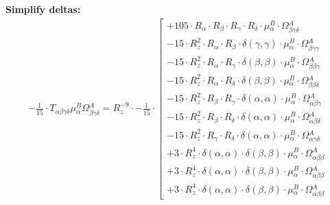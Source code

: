 \documentclass{article}
\begin{document}
\textbf{Simplify deltas:}
\begin{subequations}\begin{gather}
- \frac{1}{15} \cdot T_{\alpha{}\beta{}\gamma{}\delta{}} \mu{}^{B}_{\alpha{}} \Omega{}^{A}_{\beta{}\gamma{}\delta{}} = R_{z}^{-9} \cdot - \frac{1}{15} \cdot  \left[ \begin{array}{c} 
 		+ 105 \cdot R_{\alpha{}} \cdot R_{\beta{}} \cdot R_{\gamma{}} \cdot R_{\delta{}} \cdot \mu{}^{B}_{\alpha{}} \cdot \Omega{}^{A}_{\beta{}\gamma{}\delta{}} 
 \\[0.2em] 		 - 15 \cdot R_{z}^{2} \cdot R_{\alpha{}} \cdot R_{\beta{}} \cdot \delta{}\left(\gamma{}, \gamma{}\right) \cdot \mu{}^{B}_{\alpha{}} \cdot \Omega{}^{A}_{\beta{}\gamma{}\gamma{}} 
 \\[0.2em] 		 - 15 \cdot R_{z}^{2} \cdot R_{\alpha{}} \cdot R_{\gamma{}} \cdot \delta{}\left(\beta{}, \beta{}\right) \cdot \mu{}^{B}_{\alpha{}} \cdot \Omega{}^{A}_{\beta{}\beta{}\gamma{}} 
 \\[0.2em] 		 - 15 \cdot R_{z}^{2} \cdot R_{\alpha{}} \cdot R_{\delta{}} \cdot \delta{}\left(\beta{}, \beta{}\right) \cdot \mu{}^{B}_{\alpha{}} \cdot \Omega{}^{A}_{\beta{}\beta{}\delta{}} 
 \\[0.2em] 		 - 15 \cdot R_{z}^{2} \cdot R_{\beta{}} \cdot R_{\gamma{}} \cdot \delta{}\left(\alpha{}, \alpha{}\right) \cdot \mu{}^{B}_{\alpha{}} \cdot \Omega{}^{A}_{\alpha{}\beta{}\gamma{}} 
 \\[0.2em] 		 - 15 \cdot R_{z}^{2} \cdot R_{\beta{}} \cdot R_{\delta{}} \cdot \delta{}\left(\alpha{}, \alpha{}\right) \cdot \mu{}^{B}_{\alpha{}} \cdot \Omega{}^{A}_{\alpha{}\beta{}\delta{}} 
 \\[0.2em] 		 - 15 \cdot R_{z}^{2} \cdot R_{\gamma{}} \cdot R_{\delta{}} \cdot \delta{}\left(\alpha{}, \alpha{}\right) \cdot \mu{}^{B}_{\alpha{}} \cdot \Omega{}^{A}_{\alpha{}\gamma{}\delta{}} 
 \\[0.2em] 		 + 3 \cdot R_{z}^{4} \cdot \delta{}\left(\alpha{}, \alpha{}\right) \cdot \delta{}\left(\beta{}, \beta{}\right) \cdot \mu{}^{B}_{\alpha{}} \cdot \Omega{}^{A}_{\alpha{}\beta{}\beta{}} 
 \\[0.2em] 		 + 3 \cdot R_{z}^{4} \cdot \delta{}\left(\alpha{}, \alpha{}\right) \cdot \delta{}\left(\beta{}, \beta{}\right) \cdot \mu{}^{B}_{\alpha{}} \cdot \Omega{}^{A}_{\alpha{}\beta{}\beta{}} 
 \\[0.2em] 		 + 3 \cdot R_{z}^{4} \cdot \delta{}\left(\alpha{}, \alpha{}\right) \cdot \delta{}\left(\beta{}, \beta{}\right) \cdot \mu{}^{B}_{\alpha{}} \cdot \Omega{}^{A}_{\alpha{}\beta{}\beta{}}

\end{array}
\end{gather}
\end{subequations}
\end{document}
